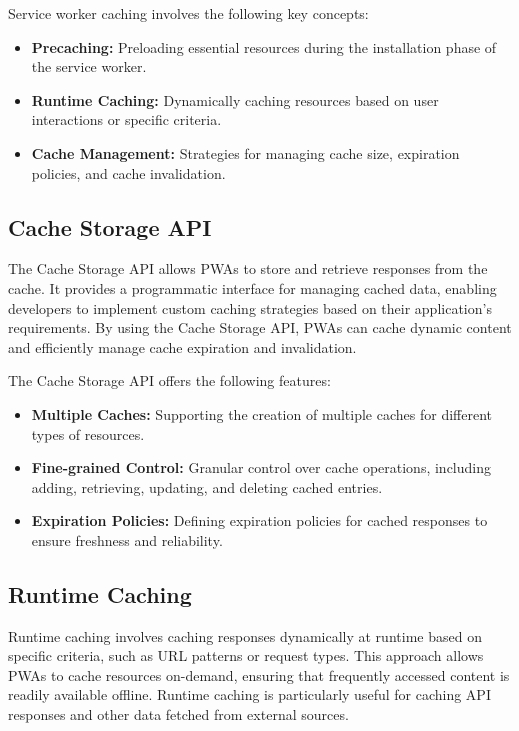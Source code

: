 \documentclass[12pt, a4paper, twoside]{article}
\begin{document}
Service worker caching involves the following key concepts:

\begin{itemize}
  \item \textbf{Precaching:} Preloading essential resources during the installation phase of the service worker.
  
  \item \textbf{Runtime Caching:} Dynamically caching resources based on user interactions or specific criteria.
  
  \item \textbf{Cache Management:} Strategies for managing cache size, expiration policies, and cache invalidation.
\end{itemize}

\subsection{Cache Storage API}
The Cache Storage API allows PWAs to store and retrieve responses from the cache. It provides a programmatic interface for managing cached data, enabling developers to implement custom caching strategies based on their application's requirements. By using the Cache Storage API, PWAs can cache dynamic content and efficiently manage cache expiration and invalidation.

The Cache Storage API offers the following features:

\begin{itemize}
  \item \textbf{Multiple Caches:} Supporting the creation of multiple caches for different types of resources.
  
  \item \textbf{Fine-grained Control:} Granular control over cache operations, including adding, retrieving, updating, and deleting cached entries.
  
  \item \textbf{Expiration Policies:} Defining expiration policies for cached responses to ensure freshness and reliability.
\end{itemize}

\subsection{Runtime Caching}
Runtime caching involves caching responses dynamically at runtime based on specific criteria, such as URL patterns or request types. This approach allows PWAs to cache resources on-demand, ensuring that frequently accessed content is readily available offline. Runtime caching is particularly useful for caching API responses and other data fetched from external sources.
\end{document}
